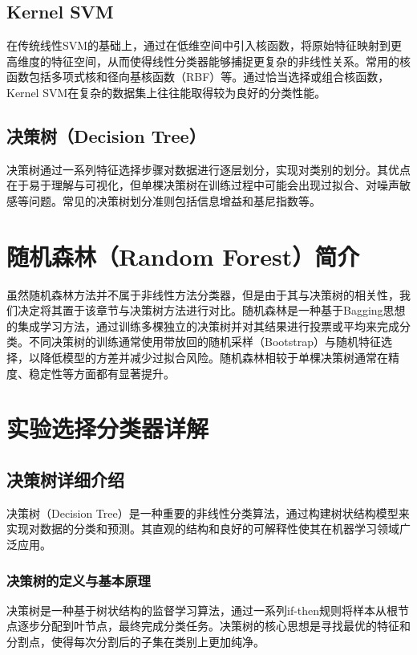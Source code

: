 \documentclass[UTF8]{report}
\theoremstyle{MyLineTheoremStyle} %
\theoremstyle{MyBlockTheoremStyle} %
\theoremstyle{MySubsubsectionStyle} %
\begin{document}
\subsection{Kernel SVM}
在传统线性SVM的基础上，通过在低维空间中引入核函数，将原始特征映射到更高维度的特征空间，从而使得线性分类器能够捕捉更复杂的非线性关系。常用的核函数包括多项式核和径向基核函数（RBF）等。通过恰当选择或组合核函数，Kernel SVM在复杂的数据集上往往能取得较为良好的分类性能。

\subsection{决策树（Decision Tree）}
决策树通过一系列特征选择步骤对数据进行逐层划分，实现对类别的划分。其优点在于易于理解与可视化，但单棵决策树在训练过程中可能会出现过拟合、对噪声敏感等问题。常见的决策树划分准则包括信息增益和基尼指数等。
\section{随机森林（Random Forest）简介}
虽然随机森林方法并不属于非线性方法分类器，但是由于其与决策树的相关性，我们决定将其置于该章节与决策树方法进行对比。随机森林是一种基于Bagging思想的集成学习方法，通过训练多棵独立的决策树并对其结果进行投票或平均来完成分类。不同决策树的训练通常使用带放回的随机采样（Bootstrap）与随机特征选择，以降低模型的方差并减少过拟合风险。随机森林相较于单棵决策树通常在精度、稳定性等方面都有显著提升。

\section{实验选择分类器详解}

\subsection{决策树详细介绍}

决策树（Decision Tree）是一种重要的非线性分类算法，通过构建树状结构模型来实现对数据的分类和预测。其直观的结构和良好的可解释性使其在机器学习领域广泛应用。

\subsubsection{决策树的定义与基本原理}

决策树是一种基于树状结构的监督学习算法，通过一系列if-then规则将样本从根节点逐步分配到叶节点，最终完成分类任务。决策树的核心思想是寻找最优的特征和分割点，使得每次分割后的子集在类别上更加纯净。
\end{document}
